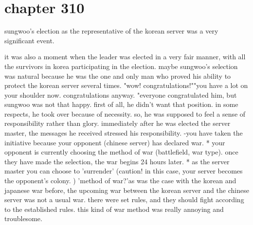 \section{chapter 310}

sungwoo's election as the representative of the korean server was a very significant event.





it was also a moment when the leader was elected in a very fair manner, with all the survivors in korea participating in the election.
 maybe sungwoo's selection was natural because he was the one and only man who proved his ability to protect the korean server several times.
"wow! congratulations!""you have a lot on your shoulder now.
 congratulations anyway.
"everyone congratulated him, but sungwoo was not that happy.
 first of all, he didn't want that position.
 in some respects, he took over because of necessity.
 so, he was supposed to feel a sense of responsibility rather than glory.
immediately after he was elected the server master, the messages he received stressed his responsibility.
-you have taken the initiative because your opponent (chinese server) has declared war.
* your opponent is currently choosing the method of war (battlefield, war type).
 once they have made the selection, the war begins 24 hours later.
* as the server master you can choose to 'surrender' (caution! in this case, your server becomes the opponent's colony.
) 'method of war?'as was the case with the korean and japanese war before, the upcoming war between the korean server and the chinese server was not a usual war.
there were set rules, and they should fight according to the established rules.
 this kind of war method was really annoying and troublesome.

